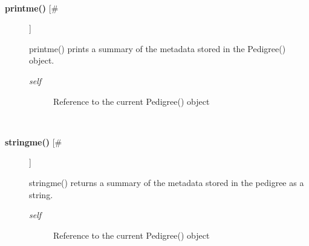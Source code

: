\begin{description}
\begin{description}
\end{description}
\\ 

\item[\textbf{printme()}
 [\#]]

 printme() prints a summary of the metadata stored in the Pedigree() object.
\begin{description}
\item[\emph{self}
] Reference to the current Pedigree() object

\end{description}
\\ 

\item[\textbf{stringme()}
 [\#]]

 stringme() returns a summary of the metadata stored in the pedigree as a string.
\begin{description}
\item[\emph{self}
] Reference to the current Pedigree() object

\end{description}
\\ 


\end{description}


